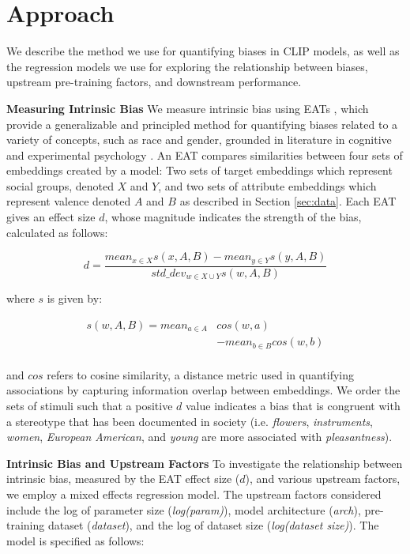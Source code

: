\section{Approach}
We describe the method we use for quantifying biases in CLIP models, as well as the regression models we use for exploring the relationship between biases, upstream pre-training factors, and downstream performance.

\noindent\textbf{Measuring Intrinsic Bias}
We measure intrinsic bias using EATs \cite{Caliskan2017SemanticsBiases, Guo2021DetectingBiases,Steed2021,Wolfe2022AmericanAI,Wolfe2023ContrastiveBias}, which provide a generalizable and principled method for quantifying biases related to a variety of concepts, such as race and gender, grounded in literature in cognitive and experimental psychology \cite{Blodgett2020LanguageNLP}. An EAT compares similarities between four sets of embeddings created by a model: Two sets of target embeddings which represent social groups, denoted $X$ and $Y$, and two sets of attribute embeddings which represent valence denoted $A$ and $B$ as described in Section \ref{sec:data}. Each EAT gives an effect size $d$, whose magnitude indicates the strength of the bias, calculated as follows: 


\[d=\frac{mean_{x \in X}s(x,A,B)-mean_{y \in Y}s(y,A,B)}{std\_dev_{w \in X \cup Y}s(w,A,B)}\]

\noindent where $s$ is given by:

\begin{equation*}
    \begin{split}
        s(w,A,B) =  mean_{a \in A}&{cos(w,a)} \\
        &- mean_{b \in B}{cos(w,b)}\\
    \end{split}
\end{equation*}

\noindent and $cos$ refers to cosine similarity, a distance metric used in quantifying associations by capturing information overlap between embeddings. We order the sets of stimuli such that a positive $d$ value indicates a bias that is congruent with a stereotype that has been documented in society (i.e. \textit{flowers}, \textit{instruments}, \textit{women}, \textit{European American}, and \textit{young} are more associated with \textit{pleasantness}). 

\noindent \textbf{Intrinsic Bias and Upstream Factors} To investigate the relationship between intrinsic bias, measured by the EAT effect size ($d$), and various upstream factors, we employ a mixed effects regression model. The upstream factors considered include the log of parameter size (\textit{log(param)}), model architecture (\textit{arch}), pre-training dataset (\textit{dataset}), and the log of dataset size (\textit{log(dataset size)}). The model is specified as follows:

